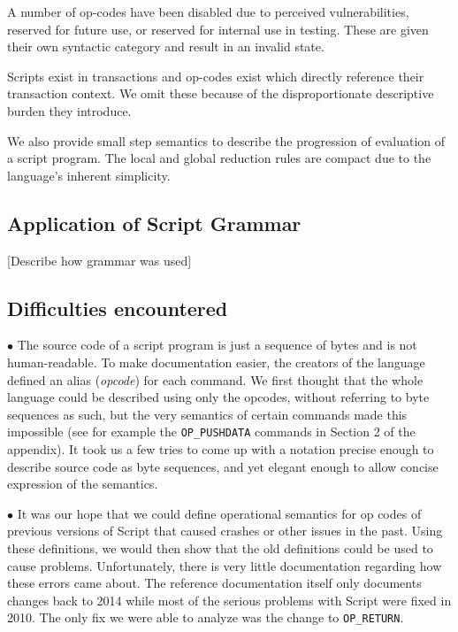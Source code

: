 \documentclass[letterpaper, 10 pt, conference]{ieeeconf}
\begin{document}
A number of op-codes have been disabled due to perceived vulnerabilities, reserved for future use, or reserved for internal use in testing. These are given their own syntactic category and result in an invalid state.

Scripts exist in transactions and op-codes exist which directly reference their transaction context. We omit these because of the disproportionate descriptive burden they introduce.

We also provide small step semantics to describe the progression of evaluation of a script program. The local and global reduction rules are compact due to the language's inherent simplicity.

\subsection{Application of Script Grammar}

[Describe how grammar was used]

\subsection{Difficulties encountered}

$\bullet$ The source code of a script program is just a sequence of bytes and is not human-readable. To make documentation easier, the creators of the language defined an alias (\textit{opcode}) for each command. We first thought that the whole language could be described using only the opcodes, without referring to byte sequences as such, but the very semantics of certain commands made this impossible (see for example the \texttt{OP\_PUSHDATA} commands in Section 2 of the appendix). It took us a few tries to come up with a notation precise enough to describe source code as byte sequences, and yet elegant enough to allow concise expression of the semantics.

$\bullet$ It was our hope that we could define operational semantics for op codes of previous versions of Script that caused crashes or other issues in the past.  Using these definitions, we would then show that the old definitions could be used to cause problems.  Unfortunately, there is very little documentation regarding how these errors came about.  The reference documentation itself only documents changes back to 2014 while most of the serious problems with Script were fixed in 2010. The only fix we were able to analyze was the change to \texttt{OP\_RETURN}.

\end{document}
